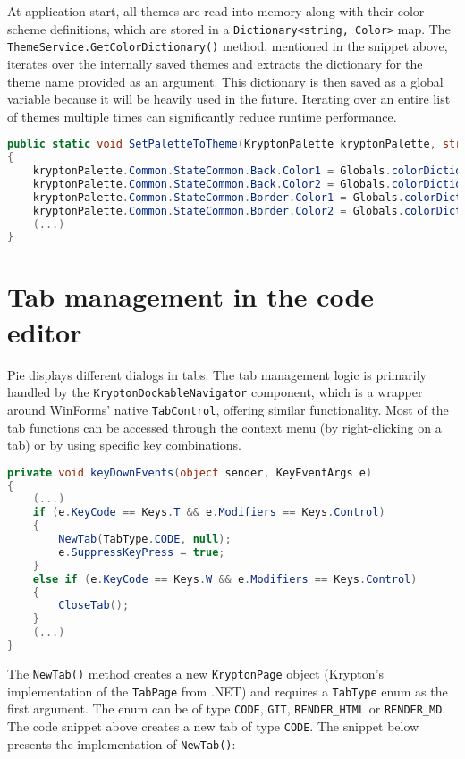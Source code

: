 At application start, all themes are read into memory along with their color scheme definitions, which are stored in a \texttt{Dictionary<string, Color>} map. The \texttt{ThemeService.GetColorDictionary()} method, mentioned in the snippet above, iterates over the internally saved themes and extracts the dictionary for the theme name provided as an argument. This dictionary is then saved as a global variable because it will be heavily used in the future. Iterating over an entire list of themes multiple times can significantly reduce runtime performance.

\begin{lstlisting}[language=csharp, caption={ThemeService.SetPaletteToTheme() maps a color dictionary to corresponding control components from a KryptonPalette control}]
public static void SetPaletteToTheme(KryptonPalette kryptonPalette, string theme)
{
    kryptonPalette.Common.StateCommon.Back.Color1 = Globals.colorDictionary["Secondary"];
    kryptonPalette.Common.StateCommon.Back.Color2 = Globals.colorDictionary["Secondary"];
    kryptonPalette.Common.StateCommon.Border.Color1 = Globals.colorDictionary["Secondary"];
    kryptonPalette.Common.StateCommon.Border.Color2 = Globals.colorDictionary["Secondary"];
    (...)
}
\end{lstlisting}

\section{Tab management in the code editor}

Pie displays different dialogs in tabs. The tab management logic is primarily handled by the \texttt{KryptonDockableNavigator} component, which is a wrapper around WinForms' native \texttt{TabControl}, offering similar functionality. Most of the tab functions can be accessed through the context menu (by right-clicking on a tab) or by using specific key combinations.

\begin{lstlisting}[language=csharp, caption={An event listener that listens for tab-related key bindings in Pie}]
private void keyDownEvents(object sender, KeyEventArgs e)
{
    (...)
    if (e.KeyCode == Keys.T && e.Modifiers == Keys.Control)
    {
        NewTab(TabType.CODE, null);
        e.SuppressKeyPress = true;
    }
    else if (e.KeyCode == Keys.W && e.Modifiers == Keys.Control)
    {
        CloseTab();
    }
    (...)
}
\end{lstlisting}

The \texttt{NewTab()} method creates a new \texttt{KryptonPage} object (Krypton's implementation of the \texttt{TabPage} from .NET) and requires a \texttt{TabType} enum as the first argument. The enum can be of type \texttt{CODE}, \texttt{GIT}, \texttt{RENDER\_HTML} or \texttt{RENDER\_MD}. The code snippet above creates a new tab of type \texttt{CODE}. The snippet below presents the implementation of \texttt{NewTab()}:

